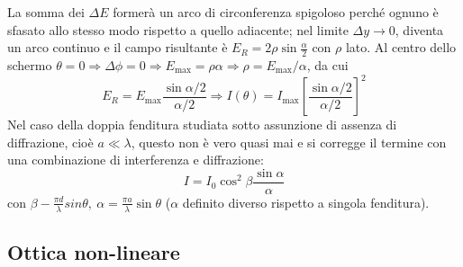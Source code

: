 \documentclass[10pt, a4paper]{scrartcl}
\numberwithin{equation}{subsection}
\theoremstyle{style1}
\begin{document}
La somma dei $\Delta E$ former\`a un arco di circonferenza spigoloso perch\'e ognuno \`e sfasato allo stesso modo rispetto a quello adiacente; nel limite $\Delta y\to 0$, diventa un arco continuo e il campo risultante \`e $E_R = 2 \rho  \sin \frac{\alpha}{2}$ con $\rho $ lato. Al centro dello schermo $\theta =0\Rightarrow \Delta \phi = 0 \Rightarrow E_\text{max}= \rho  \alpha \Rightarrow \rho  = E_\text{max}/\alpha $, da cui 
\begin{equation}
	E_R = E_\text{max} \frac{\sin \alpha  /2 }{\alpha  / 2}\Rightarrow I(\theta ) = I_\text{max}\left[ \frac{\sin \alpha  / 2}{\alpha  / 2} \right] ^2
\end{equation}
Nel caso della doppia fenditura studiata sotto assunzione di assenza di diffrazione, cio\`e $a \ll\lambda $, questo non \`e vero quasi mai e si corregge il termine con una combinazione di interferenza e diffrazione:
\begin{equation}
	I = I_0 \cos^2 \beta  \frac{\sin\alpha }{\alpha }
\end{equation}
con $\beta  - \frac{\pi d}{\lambda }sin \theta , \ \alpha  = \frac{\pi a }{\lambda }\sin \theta $ ($\alpha $ definito diverso rispetto a singola fenditura).
\subsection{Ottica non-lineare}
\end{document}

